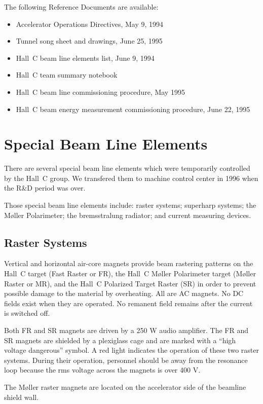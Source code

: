 The following Reference Documents are available:

\begin{itemize}
\item{Accelerator Operations Directives, May 9, 1994}
\item{Tunnel song sheet and drawings, June 25, 1995}
\item{Hall~C beam line elements list, June 9, 1994}
\item{Hall~C team summary notebook}
\item{Hall~C beam line commissioning procedure, May 1995}
\item{Hall~C beam energy measurement commissioning procedure, June 22, 1995}
\end{itemize}

\section{Special Beam Line Elements}

There are several special beam line elements which were temporarily
controlled by the Hall~C group. We transfered them to machine
control center in 1996 when the R\&D period was over.

Those special beam line elements include:  raster systems; superharp systems; the M\o ller 
Polarimeter; the bremsstralung radiator; and current measuring devices.

\subsection{Raster Systems}

Vertical and horizontal air-core magnets provide beam
rastering patterns on the Hall~C target (Fast Raster or FR), the
Hall~C M\o ller Polarimeter target (M\o ller Raster or MR), and the Hall~C 
Polarized Target Raster (SR) in order to prevent possible damage to the material by
overheating. All are AC magnets. No DC fields 
exist when they are operated. No remanent field remains after
the current is switched off.

Both FR and SR magnets are driven by a 250 W audio amplifier. The FR
and SR magnets are shielded by a plexiglass cage and are marked with a
``high voltage dangerous'' symbol.  A red light indicates the
operation of these two raster systems. During their operation, personnel
should be away from the resonance loop because the rms voltage across
the magnets is over 400 V.

The M\o ller raster magnets are located on the accelerator side of the
beamline shield wall.

